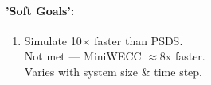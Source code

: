 \documentclass[12pt]{article}
\begin{document}
\begin{multicols}{2}
\begin{enumerate}
	\end{enumerate}
\paragraph{'Soft Goals':}
	\begin{enumerate}
	\item Simulate 10$\times$ faster than PSDS.\\ Not met --- MiniWECC $\approx$8x faster.\\Varies with system size \& time step.
	\end{enumerate}
		
		



\vfill\null

\end{multicols}


\newcommand{\mw}{\ensuremath{\text{ MW}}}
\newcommand{\hz}{\ensuremath{\text{ Hz}}}
\newcommand{\pu}{\ensuremath{\text{ Pu}}}
\newcommand{\sbase}{\ensuremath{\text{S}_{\text{Base}}}}
\newcommand{\fbase}{\ensuremath{f_{\text{Base}}}}
\newcommand{\mbase}[1]{\ensuremath{\text{M}_{\text{Base}_{#1}}}}
\newcommand{\hsys}{\ensuremath{\text{ H}_{\text{sys}}}}
\end{document}
